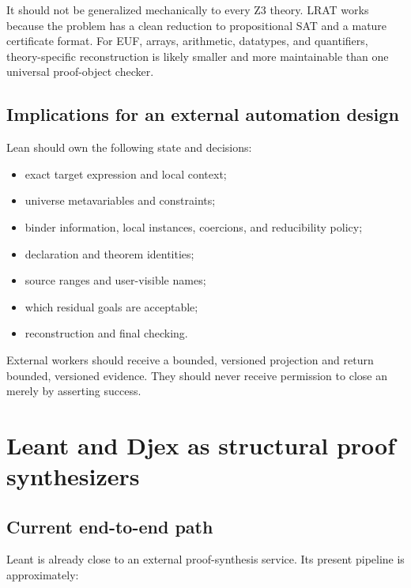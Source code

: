 \documentclass[11pt,letterpaper,openany]{report}
\newcommand{\code}[1]{\texttt{\detokenize{#1}}}
\begin{document}
It should not be generalized mechanically to every Z3 theory. LRAT works because the
problem has a clean reduction to propositional SAT and a mature certificate format.
For EUF, arrays, arithmetic, datatypes, and quantifiers, theory-specific reconstruction
is likely smaller and more maintainable than one universal proof-object checker.

\section{Implications for an external automation design}

Lean should own the following state and decisions:

\begin{itemize}
  \item exact target expression and local context;
  \item universe metavariables and constraints;
  \item binder information, local instances, coercions, and reducibility policy;
  \item declaration and theorem identities;
  \item source ranges and user-visible names;
  \item which residual goals are acceptable;
  \item reconstruction and final checking.
\end{itemize}

External workers should receive a bounded, versioned projection and return bounded,
versioned evidence. They should never receive permission to close an \code{MVarId}
merely by asserting success.

\chapter{Leant and Djex as structural proof synthesizers}
\label{ch:leant}

\section{Current end-to-end path}

Leant is already close to an external proof-synthesis service. Its present pipeline is
approximately:
\end{document}
